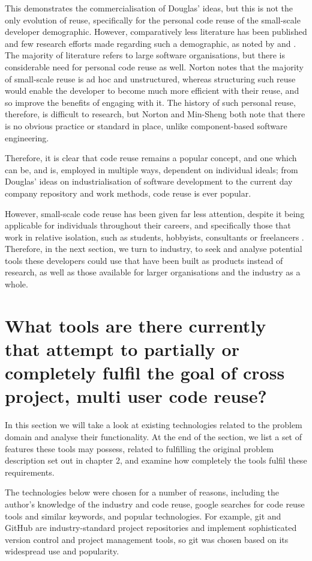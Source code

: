 This demonstrates the commercialisation of Douglas' ideas, but this is not the only evolution of reuse, specifically for the personal code reuse of the small-scale developer demographic.
However, comparatively less literature has been published and few research efforts made regarding such a demographic, as noted by \cite{Norton2003a} and \cite{Hsieh2006}. 
The majority of literature refers to large software organisations, but there is considerable need for personal code reuse as well. 
Norton notes that the majority of small-scale reuse is ad hoc and unstructured, whereas structuring such reuse would enable the developer to become much more efficient with their reuse, and so improve the benefits of engaging with it.
The history of such personal reuse, therefore, is difficult to research, but Norton and Min-Sheng both note that there is no obvious practice or standard in place, unlike component-based software engineering.

Therefore, it is clear that code reuse remains a popular concept, and one which can be, and is, employed in multiple ways, dependent on individual ideals; from Douglas' ideas on industrialisation of software development to the current day company repository and work methods, code reuse is ever popular. 

However, small-scale code reuse has been given far less attention, despite it being applicable for individuals throughout their careers, and specifically those that work in relative isolation, such as students, hobbyists, consultants or freelancers \cite{Norton2003a}. 
Therefore, in the next section, we turn to industry, to seek and analyse potential tools these developers could use that have been built as products instead of research, as well as those available for larger organisations and the industry as a whole.

\section{What tools are there currently that attempt to partially or completely fulfil the goal of cross project, multi user code reuse?}
In this section we will take a look at existing technologies related to the problem domain and analyse their functionality. 
At the end of the section, we list a set of features these tools may possess, related to fulfilling the original problem description set out in chapter 2, and examine how completely the tools fulfil these requirements.

The technologies below were chosen for a number of reasons, including the author's knowledge of the industry and code reuse, google searches for code reuse tools and similar keywords, and popular technologies. 
For example, git and GitHub are industry-standard project repositories and implement sophisticated version control and project management tools, so git was chosen based on its widespread use and popularity.


